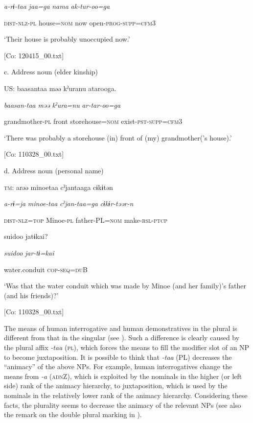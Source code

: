       \textit{a-rɨ-taa}  \textit{jaa=ga}  \textit{nama}    \textit{ak-tur-oo=ga}

      \textsc{dist}-\textsc{nlz}-\textsc{pl}  house=\textsc{nom}  now    open-\textsc{prog}-\textsc{supp}=\textsc{cfm}3

      ‘Their house is probably unoccupied now.’

      [Co: 120415\_00.txt]

  c.  Address noun (elder kinship)

    US:  baasantaa  məə  kˀuranu  atarooga.

      \textit{baasan-taa}  \textit{məə}  \textit{kˀura=nu}  \textit{ar-tar-oo=ga}

      grandmother-\textsc{pl}  front  storehouse=\textsc{nom}  exist-\textsc{pst}-\textsc{supp}=\textsc{cfm}3

      ‘There was probably a storehouse (in) front of (my) grandmother(’s house).’

      [Co: 110328\_00.txt]

  d.  Address noun (personal name)

    \textsc{tm}:  arəə  minoetaa  cˀjantaaga  cɨkɨtən

      \textit{a-rɨ=ja}  \textit{minoe-taa}  \textit{cˀjan-taa=ga}  \textit{cɨkɨr-təər-n}

      \textsc{dist}-\textsc{nlz}=\textsc{top}  Minoe-\textsc{pl}  father-PL=\textsc{nom}  make-\textsc{rsl}-\textsc{ptcp}

      {\textbar}suidoo{\textbar}  jatɨkai?

      \textit{suidoo}  \textit{jar-tɨ=kai}

      water.conduit  \textsc{cop}-\textsc{seq}=\textsc{du}B

      ‘Was that the water conduit which was made by Minoe (and her family)’s father (and his friends)?’

      [Co: 110328\_00.txt]

The means of human interrogative and human demonstratives in the plural is different from that in the singular (see ). Such a difference is clearly caused by the plural affix \textit{{}-taa} (\textsc{pl}), which forces the means to fill the modifier slot of an NP to become juxtaposition. It is possible to think that \textit{{}-taa} (PL) decreases the “animacy” of the above NPs. For example, human interrogatives change the means from \textit{{}-a} (\textsc{adn}Z), which is exploited by the nominals in the higher (or left side) rank of the animacy hierarchy, to juxtaposition, which is used by the nominals in the relatively lower rank of the animacy hierarchy. Considering these facts, the plurality seems to decrease the animacy of the relevant NPs (see also the remark on the double plural marking in ).

